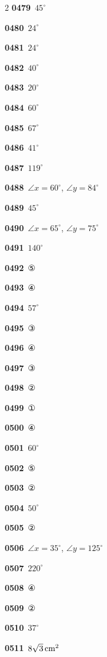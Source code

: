 \documentclass[10pt,a4paper]{article}
\begin{document}
\begin{multicols}{2}
\noindent\textbf{0479}\ $45^\circ$\par
\noindent\textbf{0480}\ $24^\circ$\par
\noindent\textbf{0481}\ $24^\circ$\par
\noindent\textbf{0482}\ $40^\circ$\par
\noindent\textbf{0483}\ $20^\circ$\par
\noindent\textbf{0484}\ $60^\circ$\par
\noindent\textbf{0485}\ $67^\circ$\par
\noindent\textbf{0486}\ $41^\circ$\par
\noindent\textbf{0487}\ $119^\circ$\par
\noindent\textbf{0488}\ $\angle x=60^\circ$, $\angle y=84^\circ$\par
\noindent\textbf{0489}\ $45^\circ$\par
\noindent\textbf{0490}\ $\angle x=65^\circ$, $\angle y=75^\circ$\par
\noindent\textbf{0491}\ $140^\circ$\par
\noindent\textbf{0492}\ ⑤\par
\noindent\textbf{0493}\ ④\par
\noindent\textbf{0494}\ $57^\circ$\par
\noindent\textbf{0495}\ ③\par
\noindent\textbf{0496}\ ④\par
\noindent\textbf{0497}\ ③\par
\noindent\textbf{0498}\ ②\par
\noindent\textbf{0499}\ ①\par
\noindent\textbf{0500}\ ④\par
\noindent\textbf{0501}\ $60^\circ$\par
\noindent\textbf{0502}\ ⑤\par
\noindent\textbf{0503}\ ②\par
\noindent\textbf{0504}\ $50^\circ$\par
\noindent\textbf{0505}\ ②\par
\noindent\textbf{0506}\ $\angle x=35^\circ$, $\angle y=125^\circ$\par
\noindent\textbf{0507}\ $220^\circ$\par
\noindent\textbf{0508}\ ④\par
\noindent\textbf{0509}\ ②\par
\noindent\textbf{0510}\ $37^\circ$\par
\noindent\textbf{0511}\ $8\sqrt{3}\mkern3mu \mathrm{cm}^2$\par

\end{multicols}
\end{document}
